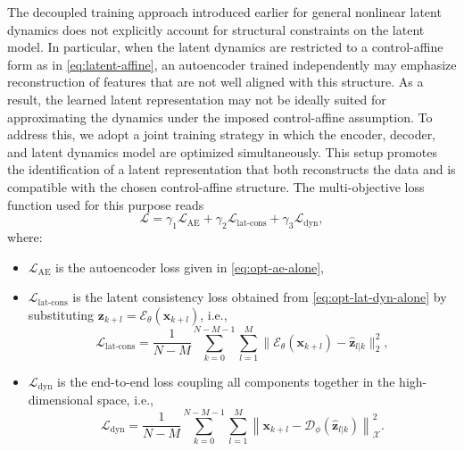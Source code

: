 \documentclass{article}
\begin{document}
The decoupled training approach introduced earlier for general nonlinear latent dynamics does not explicitly account for structural constraints on the latent model.
In particular, when the latent dynamics are restricted to a control-affine form as in \eqref{eq:latent-affine}, an autoencoder trained independently may emphasize reconstruction of features that are not well aligned with this structure.
As a result, the learned latent representation may not be ideally suited for approximating the dynamics under the imposed control-affine assumption.
To address this, we adopt a joint training strategy in which the encoder, decoder, and latent dynamics model are optimized simultaneously.
This setup promotes the identification of a latent representation that both reconstructs the data and is compatible with the chosen control-affine structure.
The multi-objective loss function used for this purpose reads
\begin{equation}
    \label{eq:mult-obj-loss}
    \mathcal{L} = \gamma_1 \mathcal{L}_{\text{AE}} + \gamma_2 \mathcal{L}_{\text{lat-cons}} + \gamma_3\mathcal{L}_{\text{dyn}},
\end{equation}
where:
\begin{itemize}
    \item $\mathcal{L}_{\text{AE}}$ is the autoencoder loss given in \eqref{eq:opt-ae-alone},
\item $\mathcal{L}_{\text{lat-cons}}$ is the latent consistency loss obtained from \eqref{eq:opt-lat-dyn-alone} by substituting $\mathbf{z}_{k+l} = \mathcal{E}_\theta(\mathbf{x}_{k+l})$, i.e.,
\begin{equation}
\label{eq:loss-lat-dyn}
\mathcal{L}_{\text{lat-cons}} = \frac{1}{N-M} \sum_{k=0}^{N-M-1} \sum_{l=1}^M \| \mathcal{E}_\theta(\mathbf{x}_{k+l}) - \hat{\mathbf{z}}_{l|k} \|_2^2,
\end{equation}
\item $\mathcal{L}_{\text{dyn}}$ is the end-to-end loss coupling all components together in the high-dimensional space, i.e.,
\begin{equation}
\label{eq:loss-dyn}
\mathcal{L}_{\text{dyn}} = \frac{1}{N-M} \sum_{k=0}^{N-M-1} \sum_{l=1}^{M} \left\| \mathbf{x}_{k+l} - \mathcal{D}_\phi(\hat{\mathbf{z}}_{l|k}) \right\|_{\mathcal{X}}^2.
\end{equation}
\end{itemize}
\end{document}
